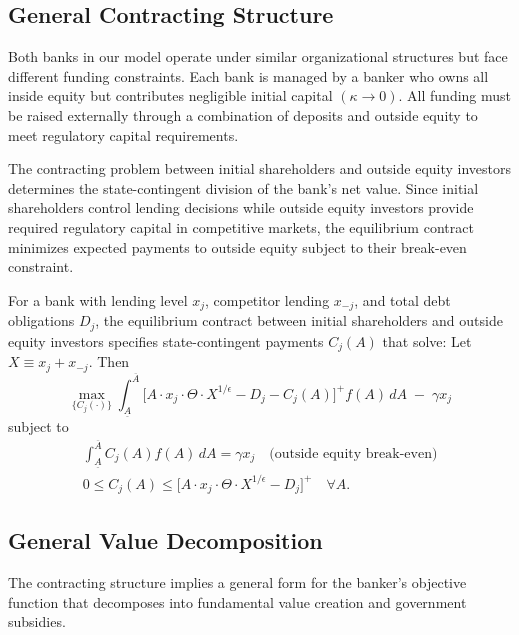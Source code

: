 \documentclass[12pt]{article}
\begin{document}
\subsection{General Contracting Structure}
Both banks in our model operate under similar organizational structures but face different funding constraints. Each bank is managed by a banker who owns all inside equity but contributes negligible initial capital $(\kappa \to 0)$. All funding must be raised externally through a combination of deposits and outside equity to meet regulatory capital requirements.

The contracting problem between initial shareholders and outside equity investors determines the state-contingent division of the bank's net value. Since initial shareholders control lending decisions while outside equity investors provide required regulatory capital in competitive markets, the equilibrium contract minimizes expected payments to outside equity subject to their break-even constraint.

\begin{definition}\label{def:contracting}
For a bank with lending level $x_{j}$, competitor lending $x_{-j}$, and total debt obligations $D_{j}$, the equilibrium contract between initial shareholders and outside equity investors specifies state-contingent payments $C_{j}(A)$ that solve:
Let $X \equiv x_j + x_{-j}$. Then
\begin{equation}
\max_{\{C_{j}(\cdot)\}} \int_{\underline{A}}^{\overline{A}} \big[ A \cdot x_{j} \cdot \Theta \cdot X^{1/\epsilon} - D_{j} - C_{j}(A) \big]^{+} f(A)\,dA \; - \; \gamma x_{j}
\end{equation}
subject to
\begin{gather*}
\int_{\underline{A}}^{\overline{A}} C_{j}(A) f(A)\,dA = \gamma x_{j} \quad \text{(outside equity break-even)} \\
0 \le C_{j}(A) \le \big[ A \cdot x_{j} \cdot \Theta \cdot X^{1/\epsilon} - D_{j} \big]^{+} \quad \forall A.
\end{gather*}
\end{definition}


\subsection{General Value Decomposition}
The contracting structure implies a general form for the banker's objective function that decomposes into fundamental value creation and government subsidies.
\end{document}
